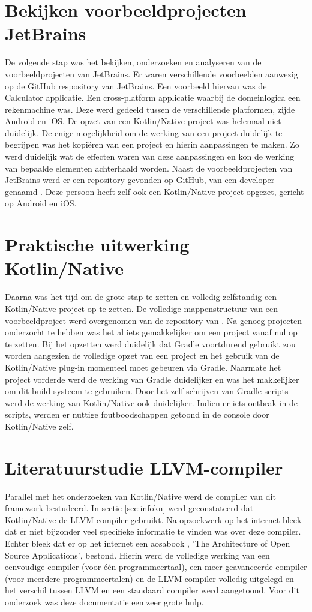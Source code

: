 \section{Bekijken voorbeeldprojecten JetBrains}
De volgende stap was het bekijken, onderzoeken en analyseren van de voorbeeldprojecten van JetBrains. Er waren verschillende voorbeelden aanwezig op de GitHub respository van JetBrains. Een voorbeeld hiervan was de Calculator applicatie. Een cross-platform applicatie waarbij de domeinlogica een rekenmachine was. Deze werd gedeeld tussen de verschillende platformen, zijde Android en iOS. De opzet van een Kotlin/Native project was helemaal niet duidelijk. De enige mogelijkheid om de werking van een project duidelijk te begrijpen was het kopiëren van een project en hierin aanpassingen te maken. Zo werd duidelijk wat de effecten waren van deze aanpassingen en kon de werking van bepaalde elementen achterhaald worden. Naast de voorbeeldprojecten van JetBrains werd er een repository gevonden op GitHub, van een developer genaamd \textcite{AlbertGao}. Deze persoon heeft zelf ook een Kotlin/Native project opgezet, gericht op Android en iOS.

\section{Praktische uitwerking Kotlin/Native}
Daarna was het tijd om de grote stap te zetten en volledig zelfstandig een Kotlin/Native project op te zetten. De volledige mappenstructuur van een voorbeeldproject werd overgenomen van de repository van \textcite{AlbertGao}. Na genoeg projecten onderzocht te hebben was het al iets gemakkelijker om een project vanaf nul op te zetten. Bij het opzetten werd duidelijk dat Gradle voortdurend gebruikt zou worden aangezien de volledige opzet van een project en het gebruik van de Kotlin/Native plug-in momenteel moet gebeuren via Gradle. Naarmate het project vorderde werd de werking van Gradle duidelijker en was het makkelijker om dit build systeem te gebruiken. Door het zelf schrijven van Gradle scripts werd de werking van Kotlin/Native ook duidelijker. Indien er iets ontbrak in de scripts, werden er nuttige foutboodschappen getoond in de console door Kotlin/Native zelf.

\section{Literatuurstudie LLVM-compiler}
Parallel met het onderzoeken van Kotlin/Native werd de compiler van dit framework bestudeerd. In sectie \ref{sec:infokn} werd geconstateerd dat Kotlin/Native de LLVM-compiler gebruikt. Na opzoekwerk op het internet bleek dat er niet bijzonder veel specifieke informatie te vinden was over deze compiler. Echter bleek dat er op het internet een aosabook \autocite{aosa}, 'The Architecture of Open Source Applications', bestond. Hierin werd de volledige werking van een eenvoudige compiler (voor één programmeertaal), een meer geavanceerde compiler (voor meerdere programmeertalen) en de LLVM-compiler volledig uitgelegd en het verschil tussen LLVM en een standaard compiler werd aangetoond. Voor dit onderzoek was deze documentatie een zeer grote hulp.

